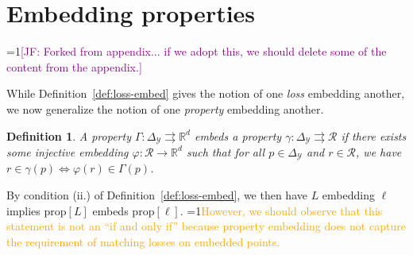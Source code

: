 \documentclass[12pt]{article}
\newcommand{\Comments}{1}
\newcommand{\mynote}[2]{\ifnum\Comments=1\textcolor{#1}{#2}\fi}
\newcommand{\raf}[1]{\mynote{green}{[RF: #1]}}
\newcommand{\jessie}[1]{\mynote{purple}{[JF: #1]}}
\newcommand{\proposedadd}[1]{\mynote{orange}{#1}}
\newcommand{\reals}{\mathbb{R}}
\newcommand{\prop}[1]{\mathrm{prop}[#1]}
\newcommand{\simplex}{\Delta_\Y}
\newcommand{\R}{\mathcal{R}}
\newcommand{\Y}{\mathcal{Y}}
\newcommand{\toto}{\rightrightarrows}
\newtheorem{corollary}{Corollary}
\newtheorem{definition}{Definition}
\begin{document}

\section{Embedding properties}\label{sec:embed-props}
\jessie{Forked from appendix... if we adopt this, we should delete some of the content from the appendix.}

While Definition~\ref{def:loss-embed} gives the notion of one \emph{loss} embedding another, we now generalize the notion of one \emph{property} embedding another.
\begin{definition}\label{def:prop-embed}
	A property $\Gamma : \simplex \toto \reals^d$ embeds a property $\gamma:\simplex \toto \R$ if there exists some injective embedding $\varphi:\R \to \reals^d$ such that for all $p \in \simplex$ and $r \in \R$, we have $r \in \gamma(p) \iff \varphi(r) \in \Gamma(p)$.
\end{definition}


By condition (ii.) of Definition~\ref{def:loss-embed}, we then have $L$ embedding $\ell$ implies $\prop{L}$ embeds $\prop{\ell}$.
\proposedadd{However, we should observe that this statement is not an ``if and only if'' because property embedding does not capture the requirement of matching losses on embedded points.}
\end{document}
